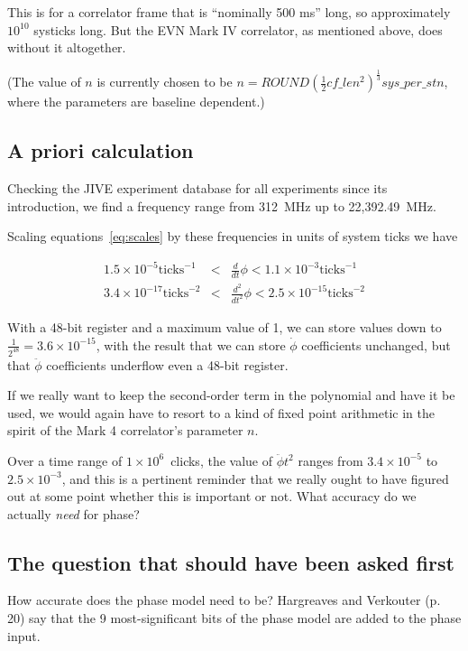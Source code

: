 \documentclass[a4paper]{article}
\begin{document}
This is for a correlator frame that is ``nominally 500 ms'' long, so
approximately $10^{10}$ systicks long.  But the EVN Mark IV
correlator, as mentioned above, does without it altogether.

(The value of $n$ is currently chosen to be $n = ROUND
\left(\frac{1}{2} cf\_len^2\right) ^ \frac{1}{3} sys\_per\_stn$, where
the parameters are baseline dependent.)

\subsection{A priori calculation}

Checking the JIVE experiment database for all experiments since its introduction, we find a frequency range from 312~MHz up to  22,392.49~MHz.

Scaling equations~\ref{eq:scales} by these frequencies in units of system ticks we have

\begin{eqnarray}
  \label{eq:phasescaleticks}
1.5\times 10^{-5} \mathrm{ticks}^{-1} &<& \frac{d}{dt}\phi < 1.1\times 10^{-3} \mathrm{ticks}^{-1} \\ 
3.4\times 10^{-17} \mathrm{ticks}^{-2} &<& \frac{d^2}{dt^2}\phi < 2.5\times 10^{-15} \mathrm{ticks}^{-2}
\end{eqnarray}

With a 48-bit register and a maximum value of 1, we can store values
down to $\frac{1}{2^{48}} = 3.6\times 10^{-15}$, with the result that
we can store $\dot{\phi}$ coefficients unchanged, but that
$\ddot{\phi}$ coefficients underflow even a 48-bit register.

If we really want to keep the second-order term in the polynomial and have it be used, we would again have to resort to a kind of fixed point arithmetic in the spirit of the Mark 4 correlator's parameter $n$.

Over a time range of $1\times 10^6$~clicks, the value of $\ddot{\phi} t^2$ ranges from $3.4\times 10^{-5}$ to $2.5\times 10^{-3}$, and this is a pertinent reminder that we really ought to have figured out at some point whether this is important or not.  What accuracy do we actually \emph{need} for phase?

\subsection{The question that should have been asked first}
How accurate does the phase model need to be?  Hargreaves and Verkouter\cite{unib} (p. 20) say that the 9 most-significant bits of the phase model are added to the phase input.
\end{document}
